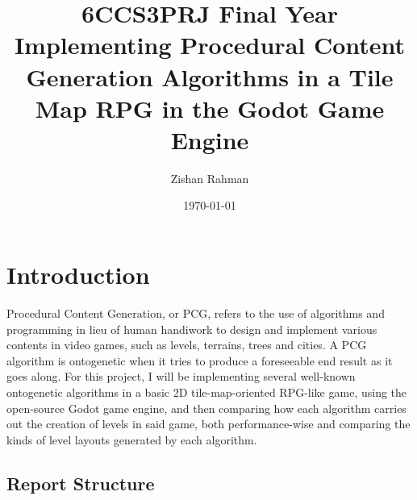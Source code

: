 \documentclass[11pt]{informatics-report}
\title{6CCS3PRJ Final Year\\\vspace{0.2cm}Implementing Procedural Content Generation Algorithms in a Tile Map RPG in the Godot Game Engine}
\author{Zishan Rahman}
\date{\today}
\begin{document}
\createFrontMatter
\onehalfspacing
\tableofcontents
\doublespacing


\chapter{Introduction}

Procedural Content Generation, or PCG, refers to the use of algorithms and programming in lieu of human handiwork to design and implement various contents in video games, such as levels, terrains, trees and cities. A PCG algorithm is ontogenetic when it tries to produce a foreseeable end result as it goes along. For this project, I will be implementing several well-known ontogenetic algorithms in a basic 2D tile-map-oriented RPG-like game, using the open-source Godot game engine, and then comparing how each algorithm carries out the creation of levels in said game, both performance-wise and comparing the kinds of level layouts generated by each algorithm.

\section{Report Structure}












\appendix



\end{document}
